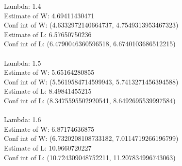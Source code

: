 \documentclass{article}
\begin{document}
Lambda:  1.4\\
	Estimate of W: 4.69411430471\\
	Conf int of W: (4.6332972140664737, 4.7549313953467323)\\
	Estimate of L: 6.57650750236\\
	Conf int of L: (6.4790046360596518, 6.6740103686512215)\\
\\
Lambda:  1.5\\
	Estimate of W: 5.65164280855\\
	Conf int of W: (5.5619584714599943, 5.7413271456394588)\\
	Estimate of L: 8.49841455215\\
	Conf int of L: (8.3475595502920541, 8.6492695539997584)\\
\\
Lambda:  1.6\\
	Estimate of W: 6.87174636875\\
	Conf int of W: (6.7320208108733182, 7.0114719266196799)\\
	Estimate of L: 10.9660720227\\
	Conf int of L: (10.724309048752211, 11.207834996743063)\\
\end{document}
